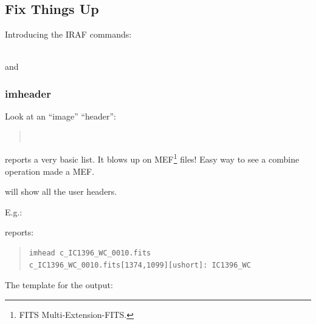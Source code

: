 \subsection{Fix Things Up}

Introducing the IRAF commands:  

{\color{verbcolor}{\verb#imheader#}}    \\
{\color{verbcolor}{\verb#hselect#}} and \\
{\color{verbcolor}{\verb#hedit#}}

\subsubsection{imheader}
Look at an ``image'' ``header'':

\begin{quote}
{\color{verbcolor}{\verb#imheader filelist#}} \\
{\color{verbcolor}{\verb#imheader filelist long+ user+ | less#}}
\end{quote}

{\color{verbcolor}{\verb#imheader filelist#}} reports a very basic
list. It blows up on MEF\footnote{FITS Multi-Extension-FITS.} files!
Easy way to see a combine operation made a MEF.

\begin{quote}
{\color{verbcolor}{\verb#imheader filelist long+ user+#}}
\end{quote}

will show all the user headers.

E.g.:

\begin{quote}
{\color{verbcolor}{\verb#imhead c_IC1396_WC_0010.fits#}}
\end{quote}

reports:

{\color{darkgreen}
\begin{quote}
\begingroup \fontsize{10pt}{10pt}
\selectfont
\begin{verbatim}
imhead c_IC1396_WC_0010.fits
c_IC1396_WC_0010.fits[1374,1099][ushort]: IC1396_WC
\end{verbatim}
\endgroup
\end{quote}
}
The template for the output:

\begin{quote}
{\color{darkgreen}{\verb#filename[NAXIS1,NAXIS2][16-bit integer]: OBJECT#}}
\end{quote}

